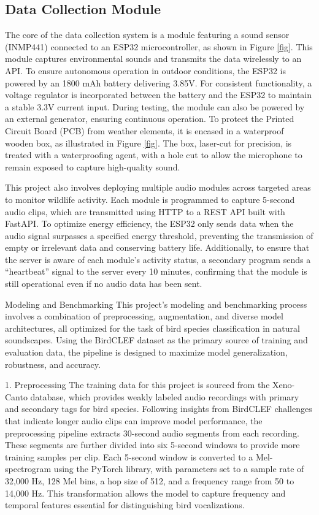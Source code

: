 \subsection{Data Collection Module}
The core of the data collection system is a module featuring a sound sensor (INMP441) connected to an ESP32 microcontroller, as shown in Figure \ref{fig}. This module captures environmental sounds and transmits the data wirelessly to an API. To ensure autonomous operation in outdoor conditions, the ESP32 is powered by an 1800 mAh battery delivering 3.85V. For consistent functionality, a voltage regulator is incorporated between the battery and the ESP32 to maintain a stable 3.3V current input. During testing, the module can also be powered by an external generator, ensuring continuous operation. To protect the Printed Circuit Board (PCB) from weather elements, it is encased in a waterproof wooden box, as illustrated in Figure \ref{fig}. The box, laser-cut for precision, is treated with a waterproofing agent, with a hole cut to allow the microphone to remain exposed to capture high-quality sound.

This project also involves deploying multiple audio modules across targeted areas to monitor wildlife activity. Each module is programmed to capture 5-second audio clips, which are transmitted using HTTP to a REST API built with FastAPI. To optimize energy efficiency, the ESP32 only sends data when the audio signal surpasses a specified energy threshold, preventing the transmission of empty or irrelevant data and conserving battery life. Additionally, to ensure that the server is aware of each module’s activity status, a secondary program sends a “heartbeat” signal to the server every 10 minutes, confirming that the module is still operational even if no audio data has been sent.

Modeling and Benchmarking
This project’s modeling and benchmarking process involves a combination of preprocessing, augmentation, and diverse model architectures, all optimized for the task of bird species classification in natural soundscapes. Using the BirdCLEF dataset as the primary source of training and evaluation data, the pipeline is designed to maximize model generalization, robustness, and accuracy.

1. Preprocessing
The training data for this project is sourced from the Xeno-Canto database, which provides weakly labeled audio recordings with primary and secondary tags for bird species. Following insights from BirdCLEF challenges that indicate longer audio clips can improve model performance, the preprocessing pipeline extracts 30-second audio segments from each recording. These segments are further divided into six 5-second windows to provide more training samples per clip. Each 5-second window is converted to a Mel-spectrogram using the PyTorch library, with parameters set to a sample rate of 32,000 Hz, 128 Mel bins, a hop size of 512, and a frequency range from 50 to 14,000 Hz. This transformation allows the model to capture frequency and temporal features essential for distinguishing bird vocalizations.

